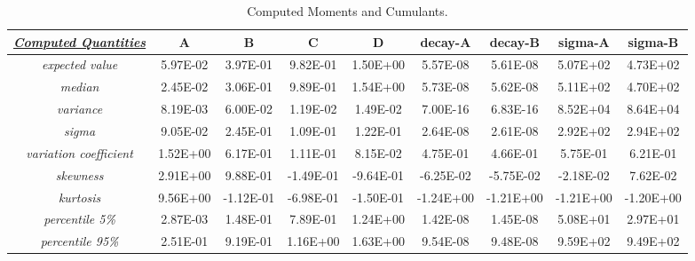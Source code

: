 \begin{landscape}
\begin{table}[h!]
\centering
\caption{Computed Moments and Cumulants.}
\label{ScalarMoments}
\begin{tabular}{|c|c|c|c|c|c|c|c|c|}
\hline
{\ul \textit{\textbf{Computed Quantities}}} & \textbf{A} & \textbf{B} & \textbf{C} & \textbf{D} & \textbf{decay-A} & \textbf{decay-B} & \textbf{sigma-A} & \textbf{sigma-B} \\ \hline
\textit{expected value}                     & 5.97E-02   & 3.97E-01   & 9.82E-01   & 1.50E+00   & 5.57E-08         & 5.61E-08         & 5.07E+02         & 4.73E+02         \\ \hline
\textit{median}                             & 2.45E-02   & 3.06E-01   & 9.89E-01   & 1.54E+00   & 5.73E-08         & 5.62E-08         & 5.11E+02         & 4.70E+02         \\ \hline
\textit{variance}                           & 8.19E-03   & 6.00E-02   & 1.19E-02   & 1.49E-02   & 7.00E-16         & 6.83E-16         & 8.52E+04         & 8.64E+04         \\ \hline
\textit{sigma}                              & 9.05E-02   & 2.45E-01   & 1.09E-01   & 1.22E-01   & 2.64E-08         & 2.61E-08         & 2.92E+02         & 2.94E+02         \\ \hline
\textit{variation coefficient}              & 1.52E+00   & 6.17E-01   & 1.11E-01   & 8.15E-02   & 4.75E-01         & 4.66E-01         & 5.75E-01         & 6.21E-01         \\ \hline
\textit{skewness}                           & 2.91E+00   & 9.88E-01   & -1.49E-01  & -9.64E-01  & -6.25E-02        & -5.75E-02        & -2.18E-02        & 7.62E-02         \\ \hline
\textit{kurtosis}                           & 9.56E+00   & -1.12E-01  & -6.98E-01  & -1.50E-01  & -1.24E+00        & -1.21E+00        & -1.21E+00        & -1.20E+00        \\ \hline
\textit{percentile 5\%}                     & 2.87E-03   & 1.48E-01   & 7.89E-01   & 1.24E+00   & 1.42E-08         & 1.45E-08         & 5.08E+01         & 2.97E+01         \\ \hline
\textit{percentile 95\%}                    & 2.51E-01   & 9.19E-01   & 1.16E+00   & 1.63E+00   & 9.54E-08         & 9.48E-08         & 9.59E+02         & 9.49E+02         \\ \hline
\end{tabular}
\end{table}

\end{landscape}
